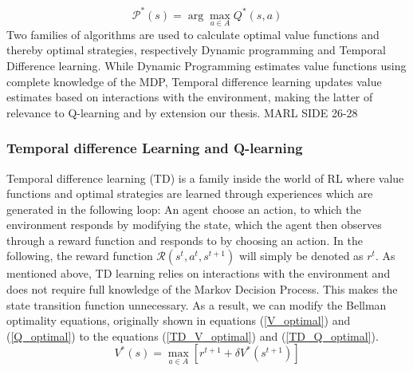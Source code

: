 \documentclass{article}
\begin{document}
\begin{equation}
    \label{Optimal_strategy}
    \mathcal{P}^*(s) =  \arg \max_{a \in A}Q^*(s,a)
\end{equation}
Two families of algorithms are used to calculate optimal value functions and thereby optimal strategies, respectively Dynamic programming and Temporal Difference learning. While Dynamic Programming estimates value functions using complete knowledge of the MDP, Temporal difference learning updates value estimates based on interactions with the environment, making the latter of relevance to Q-learning and by extension our thesis. 
MARL SIDE 26-28
\subsubsection{Temporal difference Learning and Q-learning}
\label{Temporal Difference Learning and Q-learning}
Temporal difference learning (TD) is a family inside the world of RL where value functions and optimal strategies are learned through experiences which are generated in the following loop: An agent choose an action, to which the environment responds by modifying the state, which the agent then observes through a reward function and responds to by choosing an action. In the following, the reward function $\mathcal{R}(s^t,a^t,s^{t+1})$ will simply be denoted as $r^t$. As mentioned above, TD learning relies on interactions with the environment and does not require full knowledge of the Markov Decision Process. This makes the state transition function unnecessary. As a result, we can modify the Bellman optimality equations, originally shown in equations (\ref{V_optimal}) and (\ref{Q_optimal}) to the equations (\ref{TD_V_optimal}) and (\ref{TD_Q_optimal}).
\begin{equation}
    \label{TD_V_optimal}
        V^*(s) = \max_{a\in A}[r^{t+1}+\delta V^*(s^{t+1})]
\end{equation}
\end{document}
